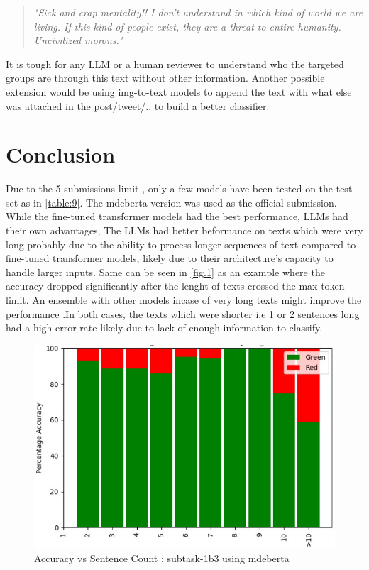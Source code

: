 \documentclass[10pt, a4paper]{article}
\begin{document}
\begin{quote}
\textit{"Sick and crap mentality!! I don't understand in which kind of world we are living. If this kind of people exist, they are a threat to entire humanity. Uncivilized morons."}
\end{quote}

It is tough for any LLM or a human reviewer to understand who the targeted groups are through this text without other information. Another possible extension would be using img-to-text models to append the text with what else was attached in the post/tweet/.. to build a better classifier.

\section{Conclusion}

Due to the 5 submissions limit , only a few models have been tested on the test set as in \autoref{table:9}. The mdeberta version was used as the official submission. While the fine-tuned transformer models had the best performance, LLMs had their own advantages, The LLMs had better beformance on texts which were very long probably due to the ability to process longer sequences of text compared to fine-tuned transformer models, likely due to their architecture's capacity to handle larger inputs. Same can be seen in \autoref{fig.1} as an example where the accuracy dropped significantly after the lenght of texts crossed the max token limit. An ensemble with other models incase of very long texts might improve the performance .In both cases, the texts which were shorter i.e 1 or 2 sentences long had a high error rate likely due to lack of enough information to classify.

\begin{figure}[!ht]
\begin{center}
\includegraphics[scale=0.5]{random.jpg} 
\caption{Accuracy vs Sentence Count : subtask-1b3 using mdeberta}
\label{fig.1}
\end{center}
\end{figure}
\end{document}

